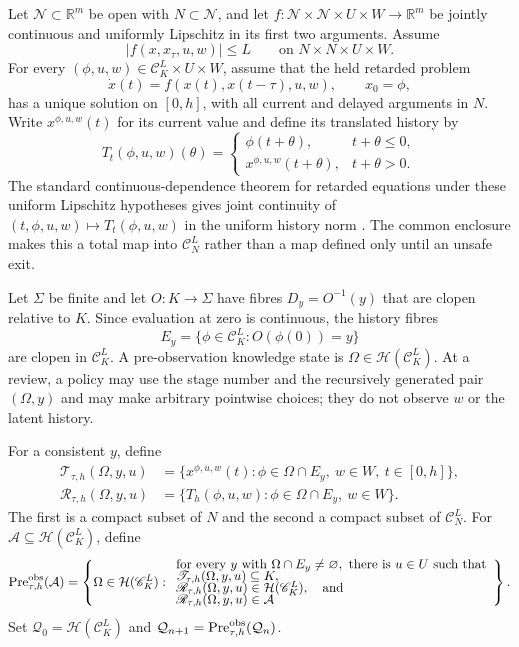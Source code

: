 \documentclass[11pt]{article}
\theoremstyle{definition}
\newcommand{\Pre}{\operatorname{Pre}}
\begin{document}
Let $\mathcal N\subset\mathbb R^m$ be open with $N\subset\mathcal N$, and let
$f:\mathcal N\times\mathcal N\times U\times W\to\mathbb R^m$ be jointly
continuous and uniformly Lipschitz in its first two arguments.  Assume
\[
\lvert f(x,x_\tau,u,w)\rvert\le L
\qquad
\text{on }N\times N\times U\times W.
\]
For every $(\phi,u,w)\in\mathscr C_K^L\times U\times W$, assume that the held
retarded problem
\begin{equation}
\dot x(t)=f(x(t),x(t-\tau),u,w),
\qquad x_0=\phi,
\label{eq:held-rfde}
\end{equation}
has a unique solution on $[0,h]$, with all current and delayed arguments in
$N$.  Write $x^{\phi,u,w}(t)$ for its current value and define its translated
history by
\[
T_t(\phi,u,w)(\theta)=
\begin{cases}
\phi(t+\theta),&t+\theta\le0,\\
x^{\phi,u,w}(t+\theta),&t+\theta>0.
\end{cases}
\]
The standard continuous-dependence theorem for retarded equations under
these uniform Lipschitz hypotheses gives joint continuity of
$(t,\phi,u,w)\mapsto T_t(\phi,u,w)$ in the uniform history norm
\cite{hale1993}.  The common enclosure makes this a total map into
$\mathscr C_N^L$ rather than a map defined only until an unsafe exit.

Let $\Sigma$ be finite and let $O:K\to \Sigma$ have fibres $D_y=O^{-1}(y)$ that are
clopen relative to $K$.  Since evaluation at zero is continuous, the
history fibres
\[
E_y=\{\phi\in\mathscr C_K^L:O(\phi(0))=y\}
\]
are clopen in $\mathscr C_K^L$.  A pre-observation knowledge state is
$\Omega\in\mathcal H(\mathscr C_K^L)$.  At a review, a policy may use the stage number and
the recursively generated pair $(\Omega,y)$ and may make arbitrary
pointwise choices; they do not observe $w$ or the latent history.

For a consistent $y$, define
\begin{align*}
\mathscr T_{\tau,h}(\Omega,y,u)
&=\{x^{\phi,u,w}(t):
\phi\in\Omega\cap E_y,\ w\in W,\ t\in[0,h]\},\\
\mathscr R_{\tau,h}(\Omega,y,u)
&=\{T_h(\phi,u,w):
\phi\in\Omega\cap E_y,\ w\in W\}.
\end{align*}
The first is a compact subset of $N$ and the second a compact subset of
$\mathscr C_N^L$.  For
$\mathcal A\subseteq\mathcal H(\mathscr C_K^L)$, define
\begin{equation}
\Pre_{\tau,h}^{\rm obs}(\mathcal A)
=\left\{\Omega\in\mathcal H(\mathscr C_K^L):
\begin{array}{l}
\text{for every }y\text{ with }\Omega\cap E_y\ne\varnothing,
\text{ there is }u\in U\text{ such that}\\[-1mm]
\mathscr T_{\tau,h}(\Omega,y,u)\subseteq K,\\[-1mm]
\mathscr R_{\tau,h}(\Omega,y,u)\in
\mathcal H(\mathscr C_K^L),\quad\text{and}\\[-1mm]
\mathscr R_{\tau,h}(\Omega,y,u)\in\mathcal A
\end{array}\right\}.
\label{eq:rfde-observation-predecessor}
\end{equation}
Set $\mathcal Q_0=\mathcal H(\mathscr C_K^L)$ and
$\mathcal Q_{n+1}=\Pre_{\tau,h}^{\rm obs}(\mathcal Q_n)$.
\end{document}
